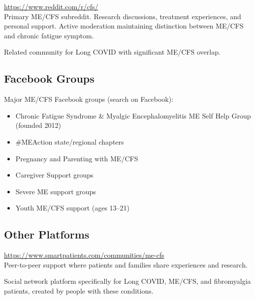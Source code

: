 \begin{description}[style=nextline]
\item[r/cfs] \hfill \url{https://www.reddit.com/r/cfs/}\\
Primary ME/CFS subreddit. Research discussions, treatment experiences, and personal support. Active moderation maintaining distinction between ME/CFS and chronic fatigue symptom.

\item[r/covidlonghaulers] \hfill Related community for Long COVID with significant ME/CFS overlap.
\end{description}

\subsection{Facebook Groups}

Major ME/CFS Facebook groups (search on Facebook):
\begin{itemize}
    \item Chronic Fatigue Syndrome \& Myalgic Encephalomyelitis ME Self Help Group (founded 2012)
    \item \#MEAction state/regional chapters
    \item Pregnancy and Parenting with ME/CFS
    \item Caregiver Support groups
    \item Severe ME support groups
    \item Youth ME/CFS support (ages 13--21)
\end{itemize}

\subsection{Other Platforms}

\begin{description}[style=nextline]
\item[Smart Patients ME/CFS Community] \hfill \url{https://www.smartpatients.com/communities/me-cfs}\\
Peer-to-peer support where patients and families share experiences and research.

\item[NURA] \hfill Social network platform specifically for Long COVID, ME/CFS, and fibromyalgia patients, created by people with these conditions.
\end{description}

